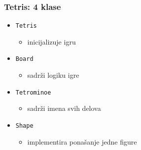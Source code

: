 \documentclass[utf8,compress,aspectratio=169]{beamer}
\begin{document}
\begin{frame}[fragile]
  \frametitle{Tetris: 4 klase}
  \begin{itemize}
    \item \texttt{Tetris}
    \begin{itemize}
      \item inicijalizuje igru
    \end{itemize}
    \item \texttt{Board}
    \begin{itemize}
      \item sadrži logiku igre
    \end{itemize}
    \item \texttt{Tetrominoe}
    \begin{itemize}
      \item sadrži imena svih delova
    \end{itemize}
    \item \texttt{Shape}
    \begin{itemize}
      \item implementira ponašanje jedne figure
    \end{itemize}
  \end{itemize}
\end{frame}
\end{document}

